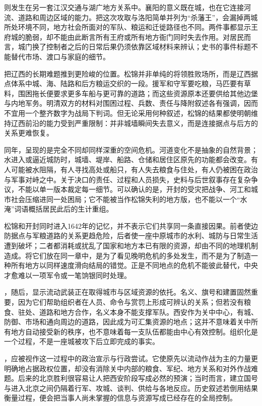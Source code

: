 则发生在另一套江汉交通与湖广地方关系中。襄阳的意义既在城，也在它连接河流、道路和周边区域的能力。把这次攻取与洛阳简单并列为“杀藩王”，会漏掉两城所处环境不同，地方社会所面对的军队、粮运和迁徙路径也不同。两件事都显示王府城的脆弱，却不能由此断言所有王府或所有地方衙门同时失去作用。对居民而言，城门换了控制者之后的日常后果仍须依靠区域材料来辨认；史书的事件标题不能替代市场、渡口与家庭的细节。

把辽西的长期难题推到更险峻的位置。松锦并非单纯的将领胜败场所，而是辽西据点体系中城、海、陆路和后方粮运交织的一段。援军和守军要吃粮，马匹要有草料，围困拖长便要求更多车船与更可靠的道路；而这些资源原本还要供给其他边堡与内地军务。明清双方的材料对围困过程、兵数、责任与降附叙述各有强调，因而不宜用一个整齐数字为战局下判词。但无论采用何种叙述，松锦的结果都使明朝维持辽西前沿的能力受到严重限制：并非城墙瞬间失去意义，而是连接据点与后方的关系更难恢复。

同年，呈现的是完全不同却同样深重的空间危机。河道变化不是抽象的自然背景；水进入或逼近城防时，城墙、堤岸、船路、仓储和居住区原先的功能都会改变。有人可能被水阻隔，有人寻找高处或船只，有人失去粮食与住处，有人仍被困在政治与军事对峙之中。关于决口的责任、过程和人员损失，史料与后世叙事存在复杂争议，不能以单一版本裁定每一细节。可以确认的是，开封的受灾把战争、河工和城市社会压缩进同一处困局；它不能被当作松锦失利的地方版，也不能以一个“水淹”词语概括居民此后的生计重组。

松锦和开封同时进入1642年的记忆，并不表示它们共享同一条直接因果。前者使边防据点与军粮道路的关系更趋危险，后者使一座中原城市的水利、城防与日常生活遭到破坏；二者都消耗或扰乱了国家和地方本已有限的资源，却由不同的地理机制造成。将它们放在同一章中，是为了看见晚明危机的多处发生，而不是为了制造一种所有地方以同样速度滑向结局的错觉。正是不同地点的危机不能彼此替代，中央才愈难以一项军令或一笔饷银同时处理。

，随后，显示流动武装正在取得城市与区域资源的依托。名义、旗号和建置固然重要，因为它们帮助组织者在人员、命令与赏罚上形成可辨认的关系；但若没有粮食、驻处、道路和地方合作，名义本身不能支撑军队。西安作为关中中心，有城、防御、市场和通向周边的道路，因此成为可汇集资源的地点；这并不意味着关中所有地方自动接受新的秩序，也不意味着每一支队伍都能由中心有效控制。组织化是一个过程，不是一座城被攻下后立即完成的事实。

，应被视作这一过程中的政治宣示与行政尝试。它使原先以流动作战为主的力量更明确地占据政权位置，却没有消除关中内部的粮食、军纪、地方关系和对外作战难题。后来的北京胜利很容易让人把西安阶段写成必然的预演；当时而言，建立国号与进入北京之间仍隔着行军、攻城、谈判、供给与各地反应。历史叙述若倒用结果衡量过程，便会把当事人尚未掌握的信息与资源写成已经存在的全局控制。

